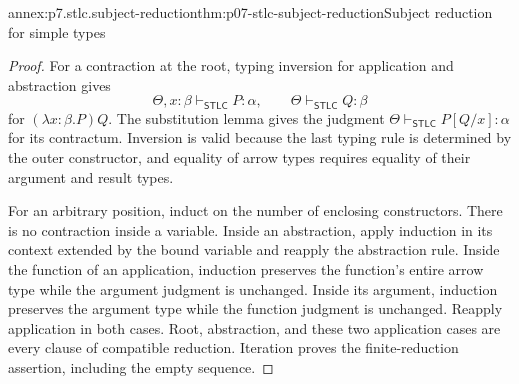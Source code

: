 \begin{annexitem}{annex:p7.stlc.subject-reduction}{thm:p07-stlc-subject-reduction}{Subject reduction for simple types}
\begin{proof}
For a contraction at the root, typing inversion for application and
abstraction gives
\[
 \Theta,x:\beta\vdash_{\mathsf{STLC}}P:\alpha,
 \qquad \Theta\vdash_{\mathsf{STLC}}Q:\beta
\]
for \((\lambda x{:}\beta.P)Q\). The substitution lemma gives the
judgment \(\Theta\vdash_{\mathsf{STLC}}P[Q/x]:\alpha\) for its
contractum. Inversion is valid because the last typing rule is determined
by the outer constructor, and equality of arrow types requires equality of
their argument and result types.

For an arbitrary position, induct on the number of enclosing constructors.
There is no contraction inside a variable. Inside an abstraction, apply
induction in its context extended by the bound variable and reapply the
abstraction rule. Inside the function of an application, induction preserves
the function's entire arrow type while the argument judgment is unchanged.
Inside its argument, induction preserves the argument type while the function
judgment is unchanged. Reapply application in both cases. Root, abstraction,
and these two application cases are every clause of compatible reduction.
Iteration proves the finite-reduction assertion, including the empty sequence.
\end{proof}
\end{annexitem}

